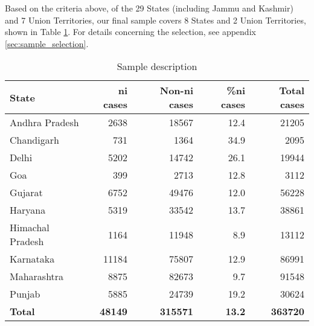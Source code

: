 Based on the criteria above, of the 29 States (including Jammu and Kashmir) and 7 Union Territories, our final sample covers 8 States and 2 Union Territories, shown in Table \ref{tab:sample_desc}. For details concerning the selection, see appendix \ref{sec:sample_selection}.

{\footnotesize \begin{longtable}{@{}lrrr|r@{}}
\caption{Sample description}
\label{tab:sample_desc}\\
\toprule
\textbf{State} & \textbf{\gls{ni} cases} & \textbf{Non-\gls{ni} cases} & \textbf{\%\gls{ni} cases} & \textbf{Total cases}\\ \midrule
\endhead
Andhra Pradesh & 2638 & 18567 & 12.4 & 21205\\
Chandigarh & 731 & 1364 & 34.9 & 2095\\
Delhi & 5202 & 14742 & 26.1 & 19944\\
Goa & 399 & 2713 & 12.8 & 3112\\
Gujarat & 6752 & 49476 & 12.0 & 56228\\
Haryana & 5319 & 33542 & 13.7 & 38861\\
Himachal Pradesh & 1164 & 11948 & 8.9 & 13112\\
Karnataka & 11184 & 75807 & 12.9 & 86991\\
Maharashtra & 8875 & 82673 & 9.7 & 91548\\
Punjab & 5885 & 24739 & 19.2 & 30624\\
\midrule
\textbf{Total} & \textbf{48149} & \textbf{315571} & \textbf{13.2} & \textbf{363720}\\ \bottomrule
\end{longtable}
}

